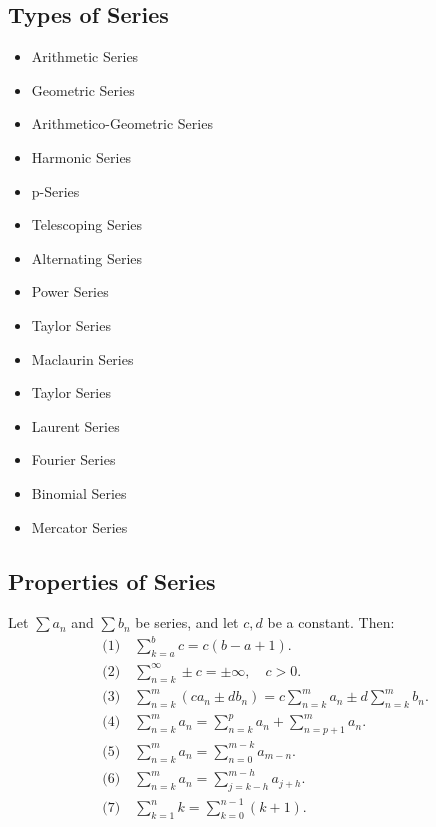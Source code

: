 \documentclass[a4paper,11pt]{article}
\theoremstyle{definition}
\theoremstyle{plain}
\theoremstyle{remark}
\begin{document}


\subsection{Types of Series}

\begin{tcolorbox}
    \begin{multicols}{3}
        \begin{itemize}
          \item Arithmetic Series
          \item Geometric Series
          \item Arithmetico-Geometric Series
          \item Harmonic Series
          \item p-Series
          \item Telescoping Series
          \item Alternating Series
          \item Power Series
          \item Taylor Series
          \item Maclaurin Series
          \item Taylor Series
          \item Laurent Series
          \item Fourier Series
          \item Binomial Series
          \item Mercator Series
        \end{itemize}
    \end{multicols}
\end{tcolorbox}




\subsection{Properties of Series}

\begin{tcolorbox}
    Let $\textstyle \sum a_n$ and $\textstyle \sum b_n$ be series, and let $c, d$ be a constant. Then:
    \[
    \begin{aligned}
        &\text{(1)} \quad \sum_{k=a}^b c = c(b - a + 1). \\[8pt]  
        &\text{(2)} \quad \sum_{n=k}^{\infty} \pm c = \pm \infty, \quad c > 0. \\[8pt]
        &\text{(3)} \quad \sum_{n=k}^{m} (ca_n \pm db_n) = c \sum_{n=k}^{m} a_n \pm d \sum_{n=k}^{m} b_n. \\[8pt]
        &\text{(4)} \quad \sum_{n=k}^{m} a_n = \sum_{n=k}^{p} a_n + \sum_{n=p+1}^{m} a_n. \\[8pt]
        &\text{(5)} \quad \sum_{n=k}^{m} a_n = \sum_{n=0}^{m-k} a_{m-n}. \\[8pt]
        &\text{(6)} \quad \sum_{n=k}^{m} a_n = \sum_{j=k-h}^{m-h} a_{j+h}. \\[8pt]
        &\text{(7)} \quad \sum_{k=1}^n k = \sum_{k=0}^{n-1} (k + 1). \\[8pt]
    \end{aligned}
    \]
\end{tcolorbox}
\end{document}
